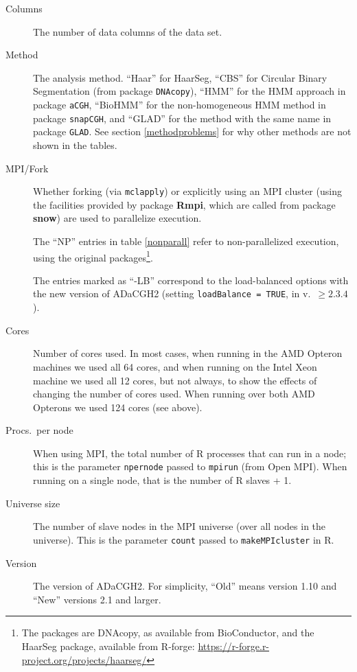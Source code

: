 \documentclass[a4paper,11pt]{article}
\begin{document}
\begin{description}
  \item[Columns] The number of data columns of the data set.
  \item[Method] The analysis method. ``Haar'' for HaarSeg, ``CBS'' for
    Circular Binary Segmentation (from package \texttt{DNAcopy}), ``HMM''
    for the HMM approach in package \texttt{aCGH}, ``BioHMM'' for the
    non-homogeneous HMM method in package \texttt{snapCGH}, and ``GLAD''
    for the method with the same name in package \texttt{GLAD}. See 
    section \ref{methodproblems} for why other methods are not shown in
    the tables.


  \item[MPI/Fork] Whether forking (via \texttt{mclapply}) or explicitly
    using an MPI cluster (using the facilities provided by package
    \textbf{Rmpi}, which are called from package \textbf{snow}) are used
    to parallelize execution.

    The ``NP'' entries in table \ref{nonparall} refer to non-parallelized
    execution, using the original packages\footnote{The packages are
      DNAcopy, as available from BioConductor, and the HaarSeg package,
      available from R-forge:
      \url{https://r-forge.r-project.org/projects/haarseg/}}.

    The entries marked as ``-LB'' correspond to the load-balanced options
    with the new version of ADaCGH2 (setting \texttt{loadBalance = TRUE},
    in v.\ $\ge 2.3.4$).


  \item[Cores] Number of cores used. In most cases, when running in the
    AMD Opteron machines we used all 64 cores, and when running on the
    Intel Xeon machine we used all 12 cores, but not always, to show the
    effects of changing the number of cores used. When running over both
    AMD Opterons we used 124 cores (see above).

  \item[Procs.\ per node] When using MPI, the total number of R processes
    that can run in a node; this is the parameter \texttt{npernode} passed
    to \texttt{mpirun} (from Open MPI). When running on a single node,
    that is the number of R slaves + 1.

  \item[Universe size] The number of slave nodes in the MPI universe (over
    all nodes in the universe). This is the parameter \texttt{count}
    passed to \texttt{makeMPIcluster} in R.

\item[Version] The version of ADaCGH2. For simplicity, ``Old'' means
  version 1.10 and ``New'' versions 2.1 and larger.
  

\end{description}
\end{document}
